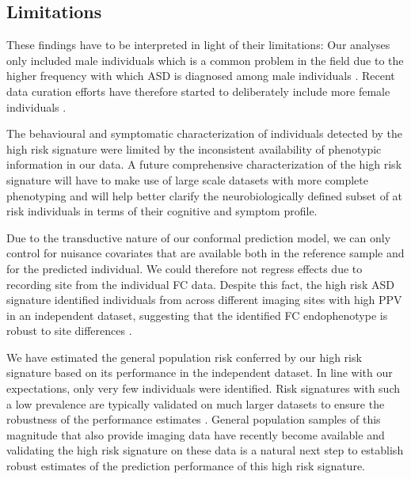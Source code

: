 \documentclass[9pt,lineno]{elife}
\begin{document}
\subsection{Limitations}
These findings have to be interpreted in light of their limitations: Our analyses only included male individuals which is a common problem in the field \citep{Khundrakpam2017-hq,Hong2019-hp} due to the higher frequency with which ASD is diagnosed among male individuals \citep{Lai2014-tf}. Recent data curation efforts have therefore started to deliberately include more female individuals \citep{Di_Martino2017-md,Bedford2019-sz}. 

The behavioural and symptomatic characterization of individuals detected by the high risk signature were limited by the inconsistent availability of phenotypic information in our data. A future comprehensive characterization of the high risk signature will have to make use of large scale datasets with more complete phenotyping and will help better clarify the neurobiologically defined subset of at risk individuals in terms of their cognitive and symptom profile.

Due to the transductive nature of our conformal prediction model, we can only control for nuisance covariates that are available both in the reference sample and for the predicted individual. We could therefore not regress effects due to recording site from the individual FC data. Despite this fact, the high risk ASD signature identified individuals from across different imaging sites with high PPV in an independent dataset, suggesting that the identified FC endophenotype is robust to site differences \citep[see also][]{Orban2018-zw}.

We have estimated the general population risk conferred by our high risk signature based on its performance in the independent dataset. In line with our expectations, only very few individuals were identified. Risk signatures with such a low prevalence are typically validated on much larger datasets to ensure the robustness of the performance estimates \citep{Khera2018-of}. General population samples of this magnitude that also provide imaging data have recently become available \citep{Bycroft2018-se} and validating the high risk signature on these data is a natural next step to establish robust estimates of the prediction performance of this high risk signature.
\end{document}
